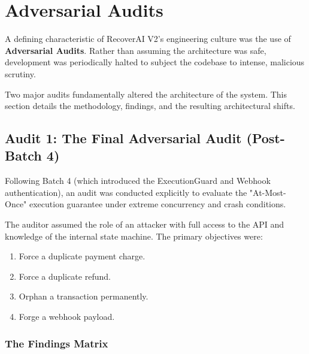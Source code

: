 
\section{Adversarial Audits}

\begin{tcolorbox}[summarybox={\iconShield[1.5] Breaking the System to Fix It}]
\color{textdark}
A defining characteristic of RecoverAI V2's engineering culture was the use of \textbf{Adversarial Audits}. Rather than assuming the architecture was safe, development was periodically halted to subject the codebase to intense, malicious scrutiny.

Two major audits fundamentally altered the architecture of the system. This section details the methodology, findings, and the resulting architectural shifts.
\end{tcolorbox}

\vspace{0.8cm}

\subsection{Audit 1: The Final Adversarial Audit (Post-Batch 4)}

Following Batch 4 (which introduced the ExecutionGuard and Webhook authentication), an audit was conducted explicitly to evaluate the "At-Most-Once" execution guarantee under extreme concurrency and crash conditions.

\begin{tcolorbox}[infobox={Audit Methodology}]
The auditor assumed the role of an attacker with full access to the API and knowledge of the internal state machine. The primary objectives were:
\begin{enumerate}
    \item Force a duplicate payment charge.
    \item Force a duplicate refund.
    \item Orphan a transaction permanently.
    \item Forge a webhook payload.
\end{enumerate}
\end{tcolorbox}

\subsubsection{The Findings Matrix}

